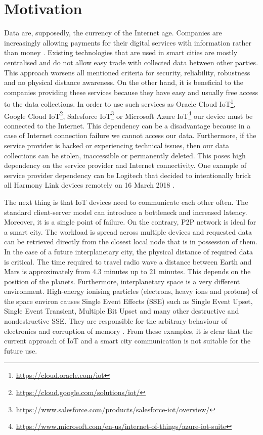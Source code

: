 \section{Motivation}
\quad Data are, supposedly, the currency of the Internet age. Companies are increasingly allowing payments for their digital services with information rather than money \cite{curtis_how_2015}. Existing technologies that are used in smart cities are mostly centralised and do not allow easy trade with collected data between other parties. This approach worsens all mentioned criteria for security, reliability, robustness and no physical distance awareness. On the other hand, it is beneficial to the companies providing these services because they have easy and usually free access to the data collections. In order to use such services as Oracle Cloud IoT\footnote{\url{https://cloud.oracle.com/iot}}, Google Cloud IoT\footnote{\url{https://cloud.google.com/solutions/iot/}}, Salesforce IoT\footnote{\url{https://www.salesforce.com/products/salesforce-iot/overview/}} or Microsoft Azure IoT\footnote{\url{https://www.microsoft.com/en-us/internet-of-things/azure-iot-suite}} our device must be connected to the Internet. This dependency can be a disadvantage because in a case of Internet connection failure we cannot access our data. Furthermore, if the service provider is hacked or experiencing technical issues, then our data collections can be stolen, inaccessible or permanently deleted. This poses high dependency on the service provider and Internet connectivity. One example of service provider dependency can be Logitech that decided to intentionally brick all Harmony Link devices remotely on 16 March 2018 \cite{noauthor_logitech_nodate}.
\vspace{\baselineskip}

The next thing is that IoT devices need to communicate each other often. The standard client-server model can introduce a bottleneck and increased latency. Moreover, it is a single point of failure. On the contrary, P2P network is ideal for a smart city. The workload is spread across multiple devices and requested data can be retrieved directly from the closest local node that is in possession of them. In the case of a future interplanetary city, the physical distance of required data is critical. The time required to travel radio wave a distance between Earth and Mars is approximately from 4.3 minutes up to 21 minutes. This depends on the position of the planets. Furthermore, interplanetary space is a very different environment. High-energy ionising particles (electrons, heavy ions and protons) of the space environ causes Single Event Effects (SSE) such as Single Event Upset, Single Event Transient, Multiple Bit Upset and many other destructive and nondestructive SSE. They are responsible for the arbitrary behaviour of electronics and corruption of memory \cite{duzellier_radiation_2005}. From these examples, it is clear that the current approach of IoT and a smart city communication is not suitable for the future use. 
\vspace{\baselineskip}

